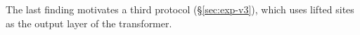 \noindent The last finding motivates a third protocol (\S\ref{sec:exp-v3}), which uses lifted sites as the output
layer of the transformer.
